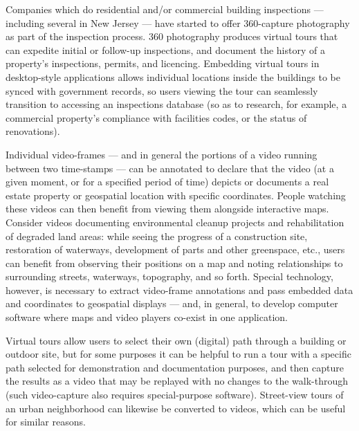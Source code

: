 \documentclass[10.5pt]{article}
\begin{document}
{

\begin{description}[leftmargin=3pt, itemsep=1pt]

\item[Building Inspections]  Companies which do residential and/or commercial building inspections 
--- including several in New Jersey --- have started to offer 360-capture photography as part of the 
inspection process.  360\textdegree{} photography produces virtual tours that can expedite 
initial or follow-up inspections, and document the history of a property's inspections, permits, and 
licencing.  Embedding virtual tours in desktop-style applications allows individual locations inside 
the buildings to be synced with government records, so users viewing the tour can seamlessly transition 
to accessing an inspections database (so as to research, for example, a commercial property's 
compliance with facilities codes, or the status of renovations). 

\item[Geotagging Videos]  Individual video-frames --- and in general the portions of a video 
running between two time-stamps --- can be annotated to declare that the 
video (at a given moment, or for a specified period of time) depicts or documents a real estate property or 
geospatial location with specific \GIS{} coordinates.  People watching 
these videos can then benefit from viewing them alongside interactive \GIS{} maps.  
Consider videos documenting environmental cleanup 
projects and rehabilitation of degraded land areas: while seeing the 
progress of a construction site, restoration of waterways, development of parts and 
other greenspace, etc., users can benefit from observing their positions on a 
map and noting relationships to surrounding streets, waterways, topography, and so forth. 
Special technology, however, is necessary to extract video-frame annotations and 
pass embedded \GIS{} data and coordinates to geospatial displays --- and, in general, 
to develop computer software where \GIS{} maps and video players co-exist in one application.    

\item[Converting street-view or virtual tours to video]  Virtual tours allow users 
to select their own (digital) path through a building or outdoor site, but for some purposes 
it can be helpful to run a tour with a specific path selected for demonstration and 
documentation purposes, and then capture the results as a video that may be 
replayed with no changes to the walk-through 
(such video-capture also requires special-purpose software).  Street-view 
tours of an urban neighborhood can likewise be converted to videos, which 
can be useful for similar reasons. 


\end{description}}
\end{document}

